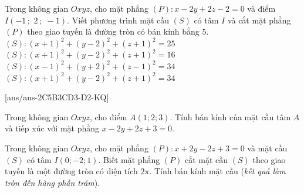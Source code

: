 \begin{ex}%
	Trong không gian $Oxyz$, cho mặt phẳng $\left( P \right)\colon x-2y+2z-2=0$ và điểm $I\left( -1\,;\,\,2\,;\,\,-1 \right)$. Viết phương trình mặt cầu $\left( S \right)$ có tâm $I$ và cắt mặt phẳng $\left( P \right)$ theo giao tuyến là đường tròn có bán kính bằng $5$.
	\choice
	{$\left( S \right)\colon\left( x+1 \right)^2+\left( y-2 \right)^2+\left( z+1 \right)^2=25$}
	{$\left( S \right)\colon\left( x+1 \right)^2+\left( y-2 \right)^2+\left( z+1 \right)^2=16$}
	{$\left( S \right)\colon\left( x-1 \right)^2+\left( y+2 \right)^2+\left( z-1 \right)^2=34$}
	{\True $\left( S \right)\colon\left( x+1 \right)^2+\left( y-2 \right)^2+\left( z+1 \right)^2=34$}
\end{ex}
\TNSA
{}[ans/ans-2C5B3CD3-D2-KQ]
\begin{ex}%
	Trong không gian $Oxyz$, cho điểm $A\left( 1;2;3 \right)$. Tính bán kính của mặt cầu tâm $A$ và tiếp xúc với mặt phẳng $x-2y+2z+3=0$.
\end{ex}

\begin{ex}%
	Trong không gian $Oxyz$, cho mặt phẳng $(P)\colon x+2 y-2 z+3=0$ và mặt cầu $(S)$ có tâm $I(0 ;-2 ; 1)$. Biết mặt phẳng $(P)$ cắt mặt cầu $(S)$ theo giao tuyến là một đường tròn có diện tích $2 \pi$. Tính bán kính mặt cầu (\textit{kết quả làm tròn đến hàng phần trăm}).
\end{ex}


